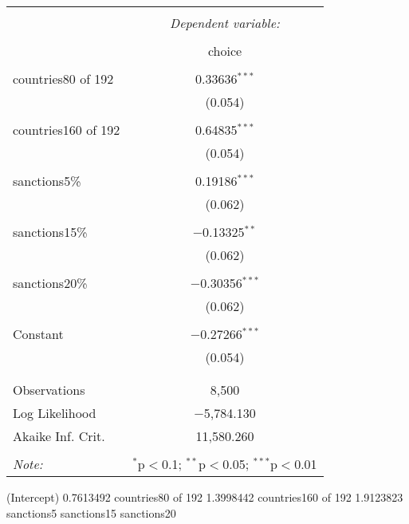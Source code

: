 \documentclass[12pt,letterpaper]{article}
\begin{document}
\begin{enumerate}
\begin{enumerate}
	\begin{table}[H] \centering   \caption{}   \label{} \begin{tabular}{@{\extracolsep{5pt}}lc} \\[-1.8ex]\hline \hline \\[-1.8ex]  & \multicolumn{1}{c}{\textit{Dependent variable:}} \\ \cline{2-2} \\[-1.8ex] & choice \\ \hline \\[-1.8ex]  countries80 of 192 & 0.33636$^{***}$ \\   & (0.054) \\   & \\  countries160 of 192 & 0.64835$^{***}$ \\   & (0.054) \\   & \\  sanctions5\% & 0.19186$^{***}$ \\   & (0.062) \\   & \\  sanctions15\% & $-$0.13325$^{**}$ \\   & (0.062) \\   & \\  sanctions20\% & $-$0.30356$^{***}$ \\   & (0.062) \\   & \\  Constant & $-$0.27266$^{***}$ \\   & (0.054) \\   & \\ \hline \\[-1.8ex] Observations & 8,500 \\ Log Likelihood & $-$5,784.130 \\ Akaike Inf. Crit. & 11,580.260 \\ \hline \hline \\[-1.8ex] \textit{Note:}  & \multicolumn{1}{r}{$^{*}$p$<$0.1; $^{**}$p$<$0.05; $^{***}$p$<$0.01} \\ \end{tabular} \end{table} 

\vspace{.25cm}

	 
	
	\begin{table}[htbp]
		\centering
		\begin{verbbox}
			(Intercept)        0.7613492
			countries80 of 192 1.3998442
			countries160 of 192 1.9123823
			sanctions5%
			sanctions15%
			sanctions20%
		\end{verbbox}
		\theverbbox
	\end{table}


\end{enumerate}
\end{enumerate}
\end{document}

